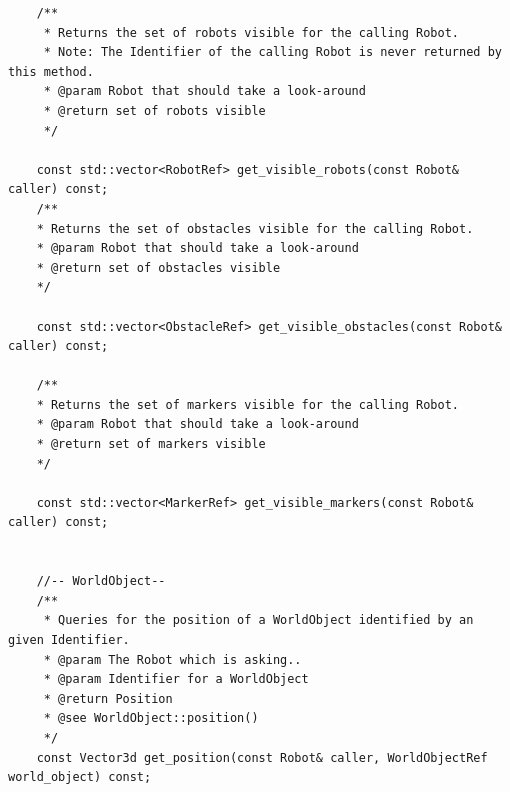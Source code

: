 \begin{appendix}
\begin{lstlisting}
	/**
	 * Returns the set of robots visible for the calling Robot.
	 * Note: The Identifier of the calling Robot is never returned by this method.
	 * @param Robot that should take a look-around
	 * @return set of robots visible
	 */

	const std::vector<RobotRef> get_visible_robots(const Robot& caller) const;
	/**
	* Returns the set of obstacles visible for the calling Robot.
	* @param Robot that should take a look-around
	* @return set of obstacles visible
	*/

	const std::vector<ObstacleRef> get_visible_obstacles(const Robot& caller) const;

	/**
	* Returns the set of markers visible for the calling Robot.
	* @param Robot that should take a look-around
	* @return set of markers visible
	*/

	const std::vector<MarkerRef> get_visible_markers(const Robot& caller) const;


	//-- WorldObject--
	/**
	 * Queries for the position of a WorldObject identified by an given Identifier.
	 * @param The Robot which is asking..
	 * @param Identifier for a WorldObject
	 * @return Position
	 * @see WorldObject::position()
	 */
	const Vector3d get_position(const Robot& caller, WorldObjectRef world_object) const;
	

\end{lstlisting}
\end{appendix}
